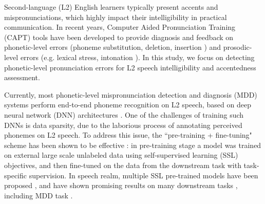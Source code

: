 \documentclass[a4paper]{article}
\newcommand{\Mu}[1]{\textcolor{blue}{Mu:#1}}
\begin{document}

Second-language (L2) English learners typically present accents and mispronunciations, which highly impact their intelligibility in practical communication. In recent years, Computer Aided Pronunciation Training (CAPT) tools have been developed to provide diagnosis and feedback on phonetic-level errors (phoneme substitution, deletion, insertion \cite{sudhakara2019improved, li2016improving, wu21h_interspeech, peng21e_interspeech, feng2020sed}) and prosodic-level errors (e.g. lexical stress, intonation \cite{korzekwa21_interspeech}). In this study, we focus on detecting phonetic-level pronunciation errors for L2 speech intelligibility and accentedness assessment.

Currently, most phonetic-level mispronunciation detection and diagnosis (MDD) systems perform end-to-end phoneme recognition on L2 speech, based on deep neural network (DNN) architectures \cite{wu21h_interspeech, peng21e_interspeech, feng2020sed, lo20b_interspeech, yan20_interspeech}. One of the challenges of training such DNNs is data sparsity, due to the laborious process of annotating perceived phonemes on L2 speech. To address this issue, the ``pre-training + fine-tuning" scheme has been shown to be effective \cite{devlin2019bert}: in pre-training stage a model was trained on external large scale unlabeled data using self-supervised learning (SSL) objectives, and then fine-tuned on the data from the downstream task with task-specific supervision. In speech realm, multiple SSL pre-trained models have been proposed \cite{baevski2020wav2vec, hsu2021hubert, wang2021unispeech, chen2021wavlm}, and have shown promising results on many downstream tasks \cite{lin2021fragmentvc, fan2020exploring, chen2021exploring}, including MDD task \cite{peng21e_interspeech}.
\end{document}
